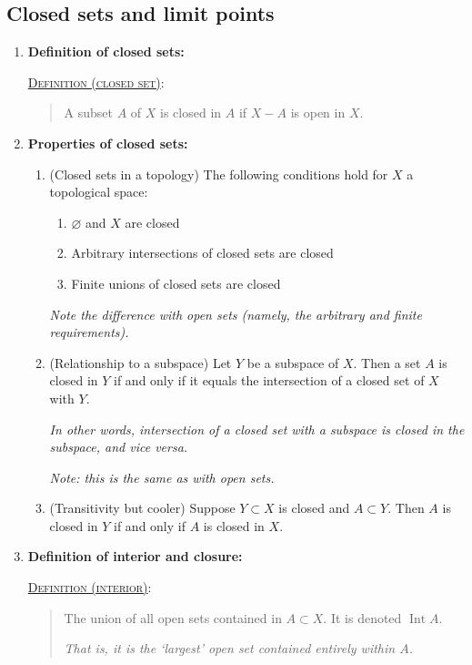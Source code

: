 \documentclass[letterpaper, 12pt]{article}
\newcommand{\defn}[2]{\textsc{\underline{Definition (#1)}:}\begin{quote} #2\end{quote}}
\let\emptyset\varnothing
\begin{document}
    \subsection{Closed sets and limit points}
        \begin{enumerate}[resume]
        \item \textbf{Definition of closed sets:} 

            \defn{closed set}{A subset $A$ of $X$ is closed in $A$ if $X-A$ is open in $X$.}
            \item \textbf{Properties of closed sets:}
                \begin{enumerate}
                \item (Closed sets in a topology) The following conditions hold for $X$ a topological space:
                \begin{enumerate}
                \item $\emptyset$ and $X$ are closed
                \item Arbitrary intersections of closed sets are closed
                \item Finite unions of closed sets are closed
                \end{enumerate}
                \textit{Note the difference with open sets (namely, the arbitrary and finite requirements).}

            \item (Relationship to a subspace) Let $Y$ be a subspace of $X$. Then a set $A$ is closed in $Y$ if and only if it equals the intersection of a closed set of $X$ with $Y$.

                \textit{In other words, intersection of a closed set with a subspace is closed in the subspace, and vice versa.}

                \textit{Note: this is the same as with open sets.}
            \item (Transitivity but cooler) Suppose $Y\subset X$ is closed and $A\subset Y$. Then $A$ is closed in $Y$ if and only if $A$ is closed in $X$.
            \end{enumerate}
        \item \textbf{Definition of interior and closure:}

            \defn{interior}{The union of all open sets contained in $A \subset X$. It is denoted $\operatorname{Int}A$.

            \textit{That is, it is the `largest' open set contained entirely within $A$.}}


\end{enumerate}
\end{document}

